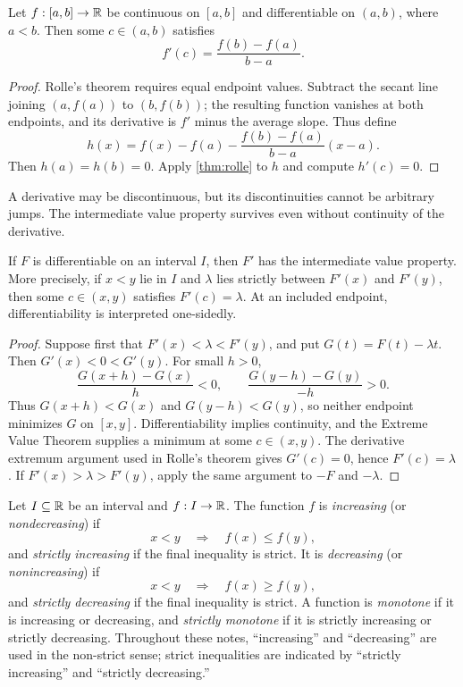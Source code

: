 \begin{theorem}
\label{thm:mean-value}
Let $f:[a,b]\to\mathbb{R}$ be continuous on $[a,b]$ and differentiable on $(a,b)$, where $a<b$. Then some $c\in(a,b)$ satisfies
\[
f'(c)=\frac{f(b)-f(a)}{b-a}.
\]
\end{theorem}
\begin{proof}
Rolle's theorem requires equal endpoint values. Subtract the secant line
joining $(a,f(a))$ to $(b,f(b))$; the resulting function vanishes at both
endpoints, and its derivative is $f'$ minus the average slope. Thus define
\[
h(x)=f(x)-f(a)-\frac{f(b)-f(a)}{b-a}(x-a).
\]
Then $h(a)=h(b)=0$. Apply \cref{thm:rolle} to $h$ and compute $h'(c)=0$.
\end{proof}

A derivative may be discontinuous, but its discontinuities cannot be
arbitrary jumps. The intermediate value property survives even without
continuity of the derivative.

\begin{theorem}
\label{thm:darboux-derivatives}
If $F$ is differentiable on an interval $I$, then $F'$ has the
intermediate value property. More precisely, if $x<y$ lie in $I$ and
$\lambda$ lies strictly between $F'(x)$ and $F'(y)$, then some
$c\in(x,y)$ satisfies $F'(c)=\lambda$.
At an included endpoint, differentiability is interpreted one-sidedly.
\end{theorem}
\begin{proof}
Suppose first that $F'(x)<\lambda<F'(y)$, and put
$G(t)=F(t)-\lambda t$. Then $G'(x)<0<G'(y)$. For small $h>0$,
\[
\frac{G(x+h)-G(x)}h<0,\qquad
\frac{G(y-h)-G(y)}{-h}>0.
\]
Thus $G(x+h)<G(x)$ and $G(y-h)<G(y)$, so neither endpoint minimizes
$G$ on $[x,y]$. Differentiability implies continuity, and the Extreme
Value Theorem supplies a minimum at some $c\in(x,y)$. The derivative
extremum argument used in Rolle's theorem gives $G'(c)=0$, hence
$F'(c)=\lambda$. If $F'(x)>\lambda>F'(y)$, apply the same argument
to $-F$ and $-\lambda$.
\end{proof}

\begin{definition}[Monotonicity]
Let $I\subseteq\mathbb{R}$ be an interval and $f:I\to\mathbb{R}$. The function $f$ is \emph{increasing} (or \emph{nondecreasing}) if
\[
x<y\quad\Longrightarrow\quad f(x)\leq f(y),
\]
and \emph{strictly increasing} if the final inequality is strict. It is \emph{decreasing} (or \emph{nonincreasing}) if
\[
x<y\quad\Longrightarrow\quad f(x)\geq f(y),
\]
and \emph{strictly decreasing} if the final inequality is strict. A function is \emph{monotone} if it is increasing or decreasing, and \emph{strictly monotone} if it is strictly increasing or strictly decreasing. Throughout these notes, ``increasing'' and ``decreasing'' are used in the non-strict sense; strict inequalities are indicated by ``strictly increasing'' and ``strictly decreasing.''
\end{definition}

